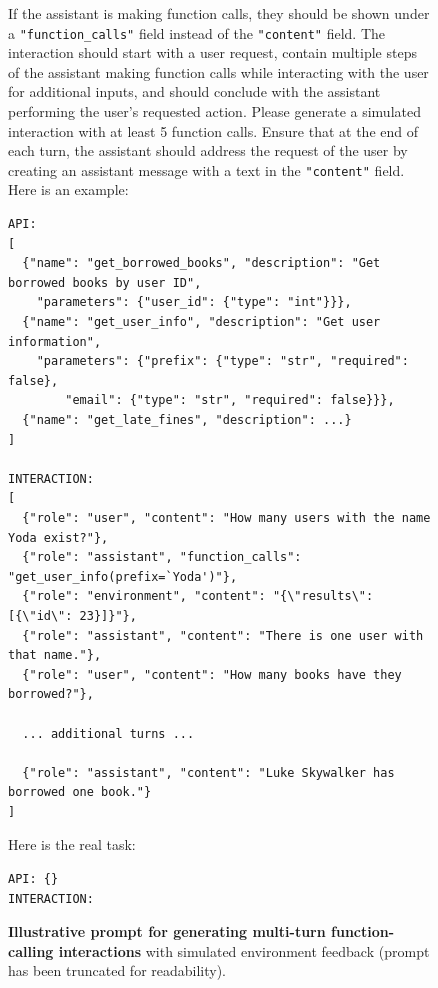 \documentclass[table]{ai2style/ai2}
\begin{document}
{{\begin{figure}[h]
\begin{prompt}{}
If the assistant is making function calls, they should be shown under a \texttt{"function\_calls"} field instead of the \texttt{"content"} field. The interaction should start with a user request, contain multiple steps of the assistant making function calls while interacting with the user for additional inputs, and should conclude with the assistant performing the user's requested action. Please generate a simulated interaction with at least 5 function calls. Ensure that at the end of each turn, the assistant should address the request of the user by creating an assistant message with a text in the \texttt{"content"} field. \\

Here is an example:

\begin{lstlisting}[basicstyle=\ttfamily\footnotesize,breaklines=true]
API:
[
  {"name": "get_borrowed_books", "description": "Get borrowed books by user ID",
    "parameters": {"user_id": {"type": "int"}}},
  {"name": "get_user_info", "description": "Get user information",
    "parameters": {"prefix": {"type": "str", "required": false},
        "email": {"type": "str", "required": false}}},
  {"name": "get_late_fines", "description": ...}
]

INTERACTION:
[
  {"role": "user", "content": "How many users with the name Yoda exist?"},
  {"role": "assistant", "function_calls": "get_user_info(prefix=`Yoda')"},
  {"role": "environment", "content": "{\"results\": [{\"id\": 23}]}"},
  {"role": "assistant", "content": "There is one user with that name."},
  {"role": "user", "content": "How many books have they borrowed?"},

  ... additional turns ...

  {"role": "assistant", "content": "Luke Skywalker has borrowed one book."}
]
\end{lstlisting}

Here is the real task:

\begin{lstlisting}[basicstyle=\ttfamily\footnotesize,breaklines=true]
API: {}
INTERACTION:
\end{lstlisting}

\end{prompt}
\vspace{-1em}
\caption{\textbf{Illustrative prompt for generating multi-turn function-calling interactions} with simulated environment feedback (prompt has been truncated for readability).}
\label{fc-multi-turn-prompt}
\end{figure}

}}
\end{document}
